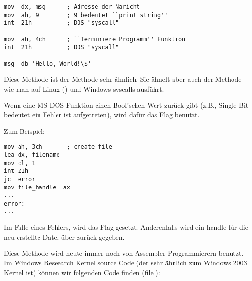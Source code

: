 \begin{lstlisting}[style=customasm]
mov  dx, msg      ; Adresse der Naricht
mov  ah, 9        ; 9 bedeutet ``print string''
int  21h          ; DOS "syscall"

mov  ah, 4ch      ; ``Terminiere Programm'' Funktion
int  21h          ; DOS "syscall"

msg  db 'Hello, World!\$' 
\end{lstlisting}

Diese Methode ist der  Methode sehr ähnlich. Sie ähnelt aber auch der Methode
wie man auf Linux () und Windows syscalls ausführt.

Wenn eine MS-DOS Funktion einen Bool'schen Wert zurück gibt (z.B., Single Bit bedeutet ein Fehler ist aufgetreten), wird dafür das  Flag benutzt.

Zum Beispiel:

\begin{lstlisting}[style=customasm]
mov ah, 3ch       ; create file
lea dx, filename
mov cl, 1
int 21h
jc  error
mov file_handle, ax
...
error:
...
\end{lstlisting}

Im Falle eines Fehlers, wird das  Flag gesetzt. Anderenfalls wird ein handle für die neu erstellte Datei über  zurück gegeben. 


Diese Methode wird heute immer noch von Assembler Programmierern benutzt.
Im Windows Reseearch Kernel source Code (der sehr ähnlich zum Windows 2003 Kernel ist) können wir folgenden Code
finden (file ):

